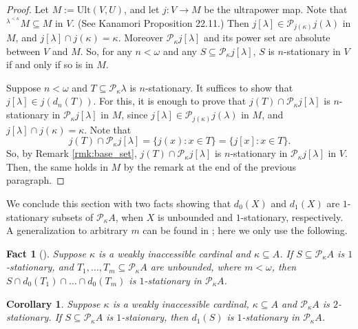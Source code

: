 \documentclass[a4paper,12pt,reqno,oneside]{amsart}
\theoremstyle{plain}
\newtheorem{corollary}[theorem]{Corollary}
\newtheorem{fact}[theorem]{Fact}
\newcommand{\mrm}{\mathrm}
\newcommand{\mcal}{\mathcal}
\begin{document}
\begin{proof}
Let $M := \mrm{Ult} (V,U)$, and let $j : V \to M$ be the ultrapower map. Note that ${}^{\lambda^{< \kappa}} M \subseteq M$ in $V$. (See Kanamori \cite{K} Proposition 22.11.) Then $j[ \lambda ] \in \mcal{P}_{j( \kappa )} j( \lambda )$ in $M$, and $j[ \lambda ] \cap j( \kappa ) = \kappa$. Moreover $\mcal{P}_\kappa j[ \lambda ]$ and its power set are absolute between $V$ and $M$. So, for any $n < \omega$ and any $S \subseteq \mcal{P}_\kappa j[ \lambda ]$, $S$ is $n$-stationary in $V$ if and only if so is in $M$.

Suppose $n < \omega$ and $T \subseteq \mcal{P}_\kappa \lambda$ is $n$-stationary. It suffices to show that $j[ \lambda ] \in j( d_n (T) )$. For this, it is enough to prove that $j(T) \cap \mcal{P}_\kappa j[ \lambda ]$ is $n$-stationary in $\mcal{P}_\kappa j[ \lambda ]$ in $M$, since $j[ \lambda ] \in \mcal{P}_{j( \kappa )} j( \lambda )$ in $M$, and $j[ \lambda ] \cap j( \kappa ) = \kappa$. Note that
\[
j(T) \cap \mcal{P}_\kappa j[ \lambda ] = \{ j(x) : x \in T \} = \{ j[x] : x \in T \} .
\]
So, by Remark \ref{rmk:base_set}, $j(T) \cap \mcal{P}_\kappa j[ \lambda ]$ is $n$-stationary in $\mcal{P}_\kappa j[ \lambda ]$ in $V$. Then, the same holds  in $M$ by the remark at the end of the previous paragraph.
\end{proof}


We conclude this section with two facts showing that $d_0(X)$ and $d_1(X)$ are $1$-stationary subsets of $\mcal{P}_\kappa A$, when $X$ is unbounded and $1$-stationary, respectively. A generalization to arbitrary $m$ can be found in \cite{CLHZ, T}; here we only use the following.


\begin{fact}[\cite{CLHZ, T}]\label{fact:1stat_easy}
Suppose $\kappa$ is a weakly inaccessible cardinal and $\kappa \subseteq A$. If $S \subseteq \mcal{P}_\kappa A$ is $1$-stationary, and $T_1 , \dots , T_m \subseteq \mcal{P}_\kappa A$ are unbounded, where $m < \omega$, then $S\cap d_0(T_1)\cap \dots \cap d_0(T_m)$ is $1$-stationary in $\mcal{P}_\kappa A$. 
\end{fact}



\begin{corollary}\label{cor:d_1stat}
Suppose $\kappa$ is a weakly inaccessible cardinal, $\kappa \subseteq A$ and $\mcal{P}_\kappa A$ is $2$-stationary. If $S \subseteq \mcal{P}_\kappa A$ is $1$-staionary, then $d_{1}(S)$ is $1$-stationary in $\mcal{P}_\kappa A$.
\end{corollary}
\end{document}
